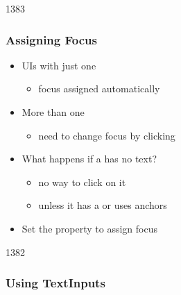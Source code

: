 \begin{slide}{1383}\frametitle{Assigning Focus}

\begin{itemize}
\item UIs with just one 
  \begin{itemize}
  \item focus assigned automatically
  \end{itemize}
\item More than one 
  \begin{itemize}
  \item need to change focus by clicking
  \end{itemize}
\item What happens if a  has no text?
  \begin{itemize}
  \item no way to click on it
  \item unless it has a  or uses anchors
  \end{itemize}
\item Set the  property to assign focus
\end{itemize}

\end{slide}


\begin{slide}{1382}\frametitle{Using TextInputs}



\end{slide}


